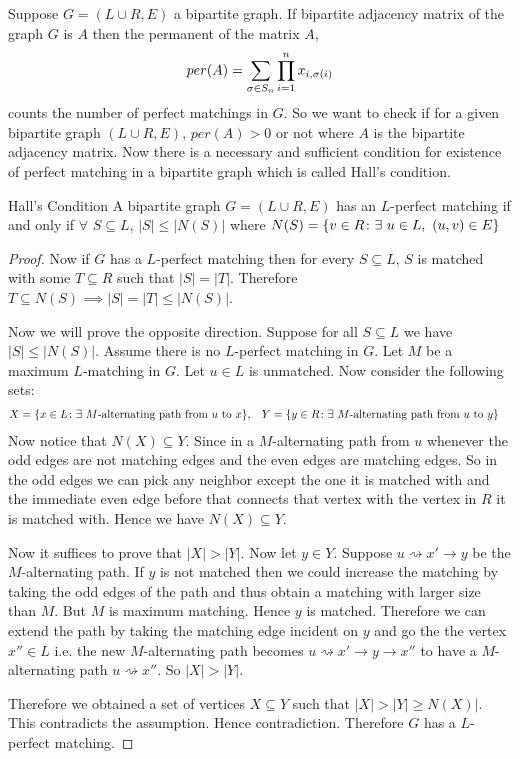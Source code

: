 Suppose $G=(L\cup R,E)$ a bipartite graph. If  bipartite adjacency matrix of the graph $G$ is $A$ then the permanent of the matrix $A$, $$per(A)=\sum\limits_{\sigma\in S_n}\prod_{i=1}^n x_{i,\sigma(i)}$$ counts the number of perfect matchings in $G$. So we want to check if for a given bipartite graph $(L\cup R,E)$, $per(A)>0$ or not where $A$ is the bipartite adjacency matrix. Now there is a necessary and sufficient condition for existence of perfect matching in a bipartite graph which is called Hall's condition.
\begin{Theorem}{Hall's Condition}{}
	A bipartite graph $G=(L\cup R,E)$ has an $L$-perfect matching if and only if $\forall $ $S\subseteq L$, $|S|\leq |N(S)|$ where $N(S)=\{v\in R\colon \exs\ u\in L,\ (u,v)\in E\}$
\end{Theorem} 
\begin{proof}
	Now if $G$ has a $L$-perfect matching then for every $S\subseteq L$, $S$ is matched with some $T\subseteq R$ such that $|S|=|T|$. Therefore $T\subseteq N(S)\implies |S|=|T|\leq |N(S)|$.
	
	Now we will prove the opposite direction. Suppose for all $S\subseteq L$ we have $|S|\leq |N(S)|$. Assume there is no $L$-perfect matching in $G$. Let $M$ be a maximum $L$-matching in $G$. Let $u\in L$ is unmatched. Now consider the following sets:\begin{align*}
		X&=\{x\in L\colon \exists\text{ $M$-alternating path from $u$ to $x$}\}, &		Y&=\{y\in R\colon \exists\text{ $M$-alternating path from $u$ to $y$}\}		
	\end{align*}
Now notice that $N(X)\subseteq Y$. Since in a $M$-alternating path from $u$ whenever the odd edges are not matching edges and the even edges are matching edges. So in the odd edges we can pick any neighbor except the one it is matched with and the immediate even edge before that connects that vertex with the vertex in $R$ it is matched with. Hence we have $N(X)\subseteq Y$.

Now it suffices to prove that $|X|>|Y|$. Now let $y\in Y$. Suppose $u\rightsquigarrow x'\to y$ be the $M$-alternating path. If $y$ is not matched then we could increase the matching by taking the odd edges of the path and thus obtain a matching with larger size than $M$. But $M$ is maximum matching. Hence $y$ is matched. Therefore we can extend the path by taking the matching edge incident on $y$ and go the the vertex $x''\in L$ i.e. the new $M$-alternating path becomes $u\rightsquigarrow x'\to y\to x''$ to have a $M$-alternating path $u\rightsquigarrow x''$. So $|X|>|Y|$.

Therefore we obtained a set of vertices $X\subseteq Y$ such that $|X|>|Y|\geq N(X)|$. This contradicts the assumption. Hence contradiction. Therefore $G$ has a $L$-perfect matching. 
\end{proof}\newpage

